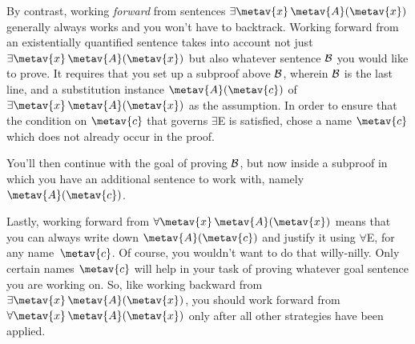 By contrast, working \emph{forward} from sentences $\exists \metav{x}\, \atom{\metav{A}}{\metav{x}}$ generally always works and you won't have to backtrack. Working forward from an existentially quantified sentence takes into account not just $\exists \metav{x}\, \atom{\metav{A}}{\metav{x}}$ but also whatever sentence $\mathcal{B}$ you would like to prove. It requires that you set up a subproof above $\mathcal{B}$, wherein $\mathcal{B}$ is the last line, and a substitution instance $\atom{\metav{A}}{\metav{c}}$ of $\exists \metav{x}\, \atom{\metav{A}}{\metav{x}}$ as the assumption.  In order to ensure that the condition on $\metav{c}$ that governs $\exists$E is satisfied, chose a name $\metav{c}$ which does not already occur in the proof.
\begin{fitchproof}
	\ellipsesline
	\ellipsesline
	\open
	\AS
	\ellipsesline
	\close
\end{fitchproof}
You'll then continue with the goal of proving $\mathcal{B}$, but now inside a subproof in which you have an additional sentence to work with, namely~$\atom{\metav{A}}{\metav{c}}$.

Lastly, working forward from $\forall \metav{x}\, \atom{\metav{A}}{\metav{x}}$ means that you can always write down $\atom{\metav{A}}{\metav{c}}$ and justify it using $\forall$E, for any name~$\metav{c}$. Of course, you wouldn't want to do that willy-nilly. Only certain names $\metav{c}$ will help in your task of proving whatever goal sentence you are working on. So, like working backward from $\exists \metav{x}\, \atom{\metav{A}}{\metav{x}}$, you should work forward from $\forall \metav{x}\, \atom{\metav{A}}{\metav{x}}$ only after all other strategies have been applied.

